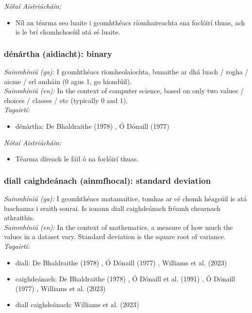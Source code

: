  \noindent \textit{Nótaí Aistriúcháin:}
\begin{itemize}
	\item Níl an téarma seo luaite i gcomhthéacs ríomhaireachta sna foclóirí thuas, ach is le brí chomhchosúil atá sé luaite.
\end{itemize}


\subsubsection*{dénártha (aidiacht): binary}
 \noindent \textit{Sainmhíniú (ga):} I gcomhthéacs ríomheolaíochta, bunaithe ar dhá luach / rogha / aicme / srl amháin (0 agus 1, go hiondúil).
\\
 \noindent \textit{Sainmhíniú (en):} In the context of computer science, based on only two values / choices / classes / etc (typically 0 and 1).
\\
 \noindent \textit{Tagairtí:}
\begin{itemize}
	\item dénártha: De Bhaldraithe (1978) \cite{de-bhaldraithe}, Ó Dónaill (1977) \cite{odonaill}
\end{itemize}

 \noindent \textit{Nótaí Aistriúcháin:}
\begin{itemize}
	\item Téarma díreach le fáil ó na foclóirí thuas.
\end{itemize}


\subsubsection*{diall caighdeánach (ainmfhocal): standard deviation}
 \noindent \textit{Sainmhíniú (ga):} I gcomhthéacs matamaitice, tomhas ar cé chomh héagsúil is atá luachanna i sraith sonraí. Is ionann diall caighdeánach fréamh chearnach athraithis.
\\
 \noindent \textit{Sainmhíniú (en):} In the context of mathematics, a measure of how much the values in a dataset vary. Standard deviation is the square root of variance.
\\
 \noindent \textit{Tagairtí:}
\begin{itemize}
	\item diall: De Bhaldraithe (1978) \cite{de-bhaldraithe}, Ó Dónaill (1977) \cite{odonaill}, Williams et al. (2023) \cite{storchiste}
	\item caighdeánach: De Bhaldraithe (1978) \cite{de-bhaldraithe}, Ó Dónaill et al. (1991) \cite{focloir-beag}, Ó Dónaill (1977) \cite{odonaill}, Williams et al. (2023) \cite{storchiste}
	\item diall caighdeánach: Williams et al. (2023) \cite{storchiste}
\end{itemize}

